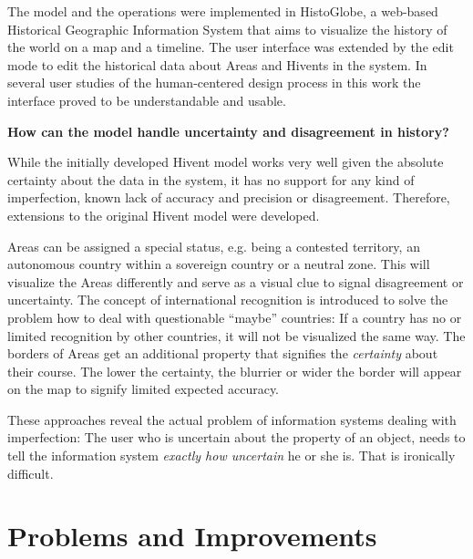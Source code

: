 The model and the operations were implemented in HistoGlobe, a web-based Historical Geographic Information System that aims to visualize the history of the world on a map and a timeline. The user interface was extended by the edit mode to edit the historical data about Areas and Hivents in the system. In several user studies of the human-centered design process in this work the interface proved to be understandable and usable.

\begin{description}[labelindent=0.55em]
  \item[\textbf{3)}]
  \textbf{
    How can the model handle uncertainty and disagreement in history?
  }
\end{description}

While the initially developed Hivent model works very well given the absolute certainty about the data in the system, it has no support for any kind of imperfection, known lack of accuracy and precision or disagreement. Therefore, extensions to the original Hivent model were developed.

Areas can be assigned a special status, e.g. being a contested territory, an autonomous country within a sovereign country or a neutral zone. This will visualize the Areas differently and serve as a visual clue to signal disagreement or uncertainty. The concept of international recognition is introduced to solve the problem how to deal with questionable ``maybe'' countries: If a country has no or limited recognition by other countries, it will not be visualized the same way. The borders of Areas get an additional property that signifies the \emph{certainty} about their course. The lower the certainty, the blurrier or wider the border will appear on the map to signify limited expected accuracy.

These approaches reveal the actual problem of information systems dealing with imperfection: The user who is uncertain about the property of an object, needs to tell the information system \emph{exactly how uncertain} he or she is. That is ironically difficult.


\section{Problems and Improvements} %
\label{sec:problems}

